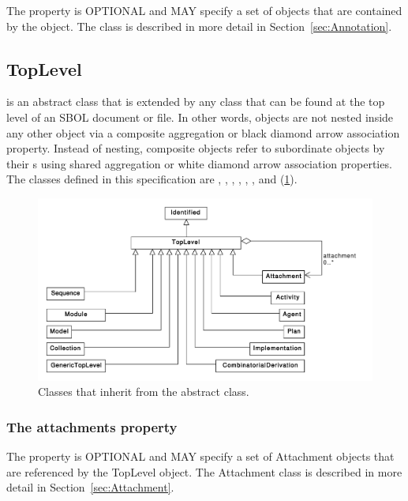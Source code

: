 The  property is OPTIONAL and MAY specify a set of  objects that are contained by the  object. The  class is described in more detail in Section~\ref{sec:Annotation}.

\subsection {TopLevel}
\label{sec:TopLevel}
 is an abstract class that is extended by any  class that can be found at the top level of an SBOL document or file. In other words,  objects are not nested inside any other object via a composite aggregation or black diamond arrow association property. Instead of nesting, composite  objects refer to subordinate  objects by their s using shared aggregation or white diamond arrow association properties. The  classes defined in this specification are , , , , , , and (\ref{uml:toplevel}).


\begin{figure}[ht]
\begin{center}
\includegraphics[width=\textwidth]{uml/toplevel}
\caption[]{Classes that inherit from the  abstract class.}
\label{uml:toplevel}
\end{center}
\end{figure}


\subsubsection*{The attachments property}
\label{sec:attachments}
The  property is OPTIONAL and MAY specify a set of Attachment objects that are referenced by the TopLevel object. The Attachment class is described in more detail in Section~\ref{sec:Attachment}.

